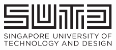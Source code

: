 \documentclass[
11pt, %
oneside, %
english, %
singlespacing, %
parskip, %
headsepline, %
]{MastersDoctoralThesis} %
\author{Eric G. \textsc{Rothstein Morris}} %
\theoremstyle{definition}
\newcommand{\0}{{0_\TheCategoryOfSets}}
\newcommand{\1}{{1_\TheCategoryOfSets}}
\newcommand{\TheBehaviourOf}[1]{{{\llbracket#1\rrbracket}}}%
\begin{document}
\frontmatter %

\pagestyle{plain} %


\begin{titlepage}
\begin{center}

\begin{figure}[t]
\centering
\includegraphics[width=0.5\textwidth]{Figures/SUTD}\\
\vspace{1cm}
	\centering

\end{figure}
\end{center}
\end{titlepage}
\end{document}
